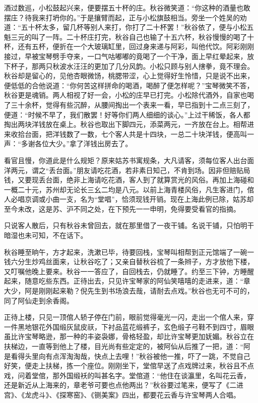 \documentclass[12pt,UTF8]{ctexbook}
\begin{document}
酒过数巡，小松鼓起兴来，便要摆五十杯的庄。秋谷微笑道：“你这种的酒量也敢摆庄？待我来打坍你的。”于是攘臂而起，正与小松旗鼓相当。旁坐一个姓吴的劝道：“五十杯太多，留几杯等别人来打，你打了二十杯罢！”秋谷依了，便与小松五魁三元的叫了一阵。二十杯庄打完，秋谷自己也输了十五六杯，秋谷慢慢的喝了十杯，还有五杯，便折在一个大玻璃缸里，回过身来递与阿彩，叫他代饮。阿彩刚刚接过，早被宝琴劈手夺来，一口气咕嘟嘟的竟喝了一个干净，面上早红晕起来，放下杯子，那两只秋波水汪汪的更加了几分风韵。小松只顾与别人搳拳，竟不理会。秋谷却是留心的，见他杏眼微饧，桃腮带涩，心上觉得好生怜惜，只是说不出来，便低低的合他说道：“你何苦这样拼命的喝酒，喝醉了便怎样呢？”宝琴微笑不答，秋谷更是魂销。两人相视了好一会，小松的庄早已打完。小松除代酒外，自家也喝了三十余杯，觉得有些沉醉，从腰间掏出一个表来一看，早已指到十二点三刻了，便道：“时候不早了，我们散罢！好等你们两人细细的谈心。”上过干稀饭，各人都掏出两块洋钱放在桌上。秋谷也取出下脚四元，添菜两元，一齐放在台上。相帮进来收拾台面，把洋钱数了一数，七个客人共是十四块，一总二十块洋钱，便高叫一声：“多谢各位大少。”拿了洋钱出房去了。

看官且慢，你道此是什么规矩？原来姑苏书寓规条，大凡请客，须每位客人出台面洋两元，谓之“丢台面。”朋友请吃花酒，若非素日知己，不肯到场。因非但赔贴局钱，又要现丢台面，绝非上海请吃花酒，客人到了就算赏光的风俗。再加上海碰和一概二十元，苏州却无论长三幺二均是八元。以前上海青楼风俗，凡生客进门，倌人必唱京调或小曲一支，名为“堂唱”，恰须现钱开销。现在上海此例已除，姑苏却至今未改，这是苏、沪不同之处，在下预先一一申明，免得要受看官的指摘。

只说客人散后，只有秋谷未曾回去，就在那里借了一夜干铺。名说干铺，只怕明干暗湿也未可知，不在话下。

秋谷睡至晌午，方才起来，洗漱已毕，待要回栈，宝琴叫相帮到正元馆端了一碗一钱六分生炒鸡丝面来，让秋谷吃了；又亲自替秋谷梳了一条辫子，方才放他下楼，又叮嘱他晚上要来。秋谷一一答应了，自回栈去，仍就睡了。约至三下钟，方睡醒起来，随意吃些东西。正待出去，只见许宝琴家的阿仙笑嘻嘻的走进来，道：“章大少，阿是刚刚起来勒？倪先生到书场浪去哉，请耐去点戏。”秋谷也无可不可的，同了阿仙走到余香阁。

正待上楼，只见一顶倌人轿子停在门前，眼前觉得毫光一闪，走出一个倌人来，穿一件黑地银花外国缎灰鼠皮祆，下衬品蓝花缎裤子，玄色缎子弓鞋不到四寸，眉眼虽比许宝琴略逊，那一种的丰姿袅娜，骨格轻盈，却比许宝琴更加妩媚。秋谷立在扶梯边，一直等到他上了楼，目光尚有些定定的，被阿仙从后推了一把，道：“阿是看得头里向有点浑淘淘哉，快点上去哩！”秋谷被他一推，吓了一跳，不觉自己好笑，便走上扶梯，拣一个座位。刚刚坐下，堂倌早送了点戏牌过来，秋谷且不点戏，问着堂倌，那外国缎袄的叫甚名字。堂倌道：“他住在谈瀛里，名叫花云香，还是新近从上海来的，章老爷可要也点他两出？”秋谷要过笔来，便写了《二进宫》、《龙虎斗》、《探寒窑》、《铡美案》四出，都要花云香与许宝琴两人合唱。
\end{document}
